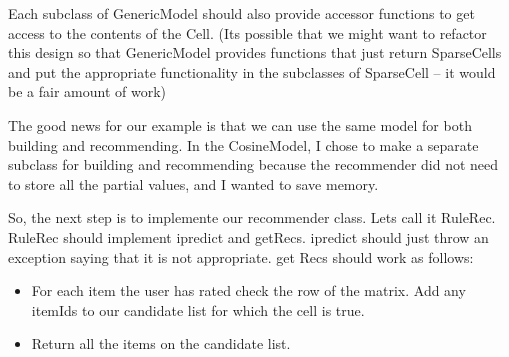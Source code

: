 \documentclass[12pt]{article}
\begin{document}
Each subclass of GenericModel should also provide accessor functions
to get access to the contents of the Cell.  (Its possible that we might
want to refactor this design so that GenericModel provides functions
that just return SparseCells and put the appropriate functionality in
the subclasses of SparseCell -- it would be a fair amount of work)

The good news for our example is that we can use the same model for
both building and recommending.  In the CosineModel, I chose to make a
separate subclass for building and recommending because the
recommender did not need to store all the partial values, and I wanted
to save memory.

So, the next step is to implemente our recommender class.  Lets call
it RuleRec.  RuleRec should implement ipredict and getRecs.  ipredict
should just throw an exception saying that it is not appropriate.  get
Recs should work as follows:

\begin{itemize}
\item For each item the user has rated check the row of the matrix.
  Add any itemIds to our candidate list for which the cell is true.
\item Return all the items on the candidate list.
\end{itemize}
\end{document}
